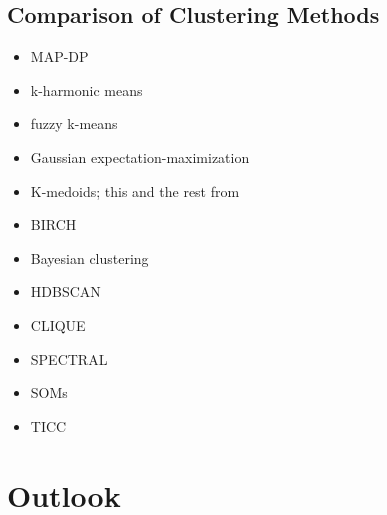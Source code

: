 \subsection{Comparison of Clustering Methods}
\begin{itemize}
    \item MAP-DP \cite{HAM-ALT}
    \item k-harmonic means \cite{RAY-ALT}
    \item fuzzy k-means \cite{RAY-ALT}
    \item Gaussian expectation-maximization \cite{RAY-ALT}
    \item K-medoids; this and the rest from \cite{COL-ALT}
    \item BIRCH
    \item Bayesian clustering
    \item HDBSCAN
    \item CLIQUE
    \item SPECTRAL
    \item SOMs
    \item TICC
\end{itemize}

\section{Outlook}
